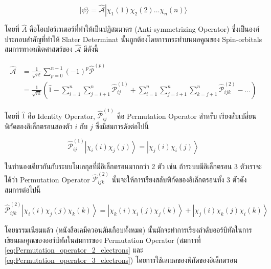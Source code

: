 \begin{equation}
    \label{eq:Slater_determinant_simple}
    |\psi\rangle
    =
    \hat{\mathscr{A}} \left|\right. \chi_1(1) \chi_2(2) \ldots \chi_n(n)\bigr\rangle
\end{equation}

\noindent โดยที่ $\hat{A}$ คือโอเปอร์เรเตอร์ที่ทำให้เป็นปฏิสมมาตร (Anti-symmetrizing Operator) ซึ่งเป็นองค์ประกอบสำคัญที่ทำให้%
Slater Determinat นั้นถูกต้องโดยการกระทำบนผลคูณของ Spin-orbitals สมการทางคณิตศาสตร์ของ $\hat{\mathscr{A}}$ มีดังนี้

\begin{equation}
    \label{eq:Antisymmetrizing_operator}
    \begin{aligned}
        \hat{\mathscr{A}}
         & = \frac{1}{\sqrt{n !}} \sum_{p=0}^{n-1}(-1)^p \hat{\mathscr{P}}^{(p)}                         \\
         & = \frac{1}{\sqrt{n !}}\left(\hat{1}-\sum_{i=1}^n \sum_{j=i+1}^n \hat{\mathscr{P}}_{i j}^{(1)}
        + \sum_{i=1}^n \sum_{j=i+1}^n \sum_{k=j+1}^n \hat{\mathscr{P}}_{i j k}^{(2)}-\ldots\right)
    \end{aligned}
\end{equation}

\noindent โดยที่ $\hat{1}$ คือ Identity Operator, $\hat{\mathscr{P}}_{i j}^{(1)}$ คือ Permutation Operator สำหรับ%
เรียงสับเปลี่ยนพิกัดของอิเล็กตรอนสองตัว $i$ กับ $j$ ซึ่งมีสมการดังต่อไปนี้

\begin{equation}
    \label{eq:Permutation_operator_2_electrons}
    \hat{\mathscr{P}}_{i j}^{(1)}\left|\chi_i(i) \chi_j(j)\right\rangle
    =
    \left|\chi_j(i) \chi_i(j)\right\rangle
\end{equation}

ในทำนองเดียวกันกับระบบโมเลกุลที่มีอิเล็กตรอนมากกว่า 2 ตัว เช่น ถ้าระบบมีอิเล็กตรอน 3 ตัวเราจะได้ว่า Permutation Operator
$\hat{\mathcal{P}}_{i j k}^{(2)}$ นั้นจะให้การเรียงสลับพิกัดของอิเล็กตรอนทั้ง 3 ตัวดังสมการต่อไปนี้

\begin{equation}
    \label{eq:Permutation_operator_3_electrons}
    \hat{\mathscr{P}}_{i j k}^{(2)}\left|\chi_i(i) \chi_j(j) \chi_k(k)\right\rangle
    =
    \left|\chi_k(i) \chi_i(j) \chi_j(k)\right\rangle
    + \left|\chi_j(i) \chi_k(j) \chi_i(k)\right\rangle
\end{equation}

โดยธรรมเนียมแล้ว (หนังสือเคมีควอนตัมเกือบทั้งหมด) นั้นมักจะทำการเรียงลำดับออร์บิทัลในการเขียนผลคูณของออร์บิทัลในสมการของ Permutation
Operator (สมการที่ \ref{eq:Permutation_operator_2_electrons} และ \ref{eq:Permutation_operator_3_electrons})
โดยการใช้เลเบลของพิกัดของอิเล็กตรอน

